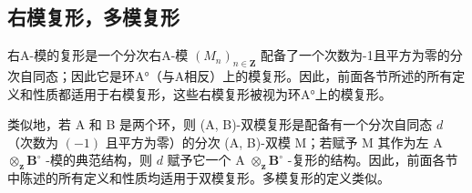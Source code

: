 \subsection{右模复形，多模复形}

右A-模的复形是一个分次右A-模 \((M_{n})_{n\in\mathbf{Z}}\) 配备了一个次数为-1且平方为零的分次自同态；因此它是环A°（与A相反）上的模复形。因此，前面各节所述的所有定义和性质都适用于右模复形，这些右模复形被视为环A°上的模复形。

类似地，若 A 和 B 是两个环，则 (A, B)-双模复形是配备有一个分次自同态 \(d\) （次数为 \((-1)\) 且平方为零）的分次 (A, B)-双模 M；若赋予 M 其作为左 A \(\otimes_{\mathbf{z}} \mathbf{B}^{\circ}\) -模的典范结构，则 \(d\) 赋予它一个 A \(\otimes_{\mathbf{z}} \mathbf{B}^{\circ}\) -复形的结构。因此，前面各节中陈述的所有定义和性质均适用于双模复形。多模复形的定义类似。

